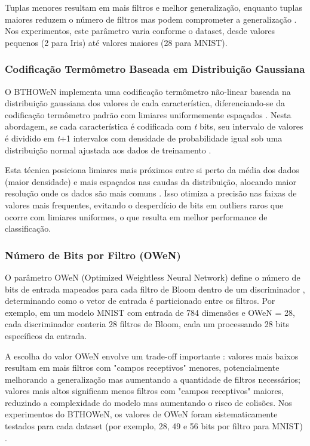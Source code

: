 \documentclass{article}
\begin{document}
Tuplas menores resultam em mais filtros e melhor generalização, enquanto tuplas maiores reduzem o número de filtros mas podem comprometer a generalização \cite{santiago2020}. Nos experimentos, este parâmetro varia conforme o dataset, desde valores pequenos (2 para Iris) até valores maiores (28 para MNIST).

\subsubsection{Codificação Termômetro Baseada em Distribuição Gaussiana}

O BTHOWeN implementa uma codificação termômetro não-linear baseada na distribuição gaussiana dos valores de cada característica, diferenciando-se da codificação termômetro padrão com limiares uniformemente espaçados \cite{santiago2020}. Nesta abordagem, se cada característica é codificada com \textit{t} bits, seu intervalo de valores é dividido em \textit{t}+1 intervalos com densidade de probabilidade igual sob uma distribuição normal ajustada aos dados de treinamento \cite{susskind2022}.

Esta técnica posiciona limiares mais próximos entre si perto da média dos dados (maior densidade) e mais espaçados nas caudas da distribuição, alocando maior resolução onde os dados são mais comuns \cite{santiago2020}. Isso otimiza a precisão nas faixas de valores mais frequentes, evitando o desperdício de bits em outliers raros que ocorre com limiares uniformes, o que resulta em melhor performance de classificação.

\subsubsection{Número de Bits por Filtro (OWeN)}

O parâmetro OWeN (Optimized Weightless Neural Network) define o número de bits de entrada mapeados para cada filtro de Bloom dentro de um discriminador \cite{santiago2020}, determinando como o vetor de entrada é particionado entre os filtros. Por exemplo, em um modelo MNIST com entrada de 784 dimensões e OWeN = 28, cada discriminador conteria 28 filtros de Bloom, cada um processando 28 bits específicos da entrada.

A escolha do valor OWeN envolve um trade-off importante \cite{santiago2020, susskind2022}: valores mais baixos resultam em mais filtros com "campos receptivos" menores, potencialmente melhorando a generalização mas aumentando a quantidade de filtros necessários; valores mais altos significam menos filtros com "campos receptivos" maiores, reduzindo a complexidade do modelo mas aumentando o risco de colisões. Nos experimentos do BTHOWeN, os valores de OWeN foram sistematicamente testados para cada dataset (por exemplo, 28, 49 e 56 bits por filtro para MNIST) \cite{santiago2020}.
\end{document}

